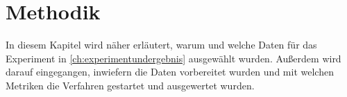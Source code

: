 \chapter{Methodik}
In diesem Kapitel wird näher erläutert, warum und welche Daten für das Experiment in \autoref{ch:experimentundergebnis} ausgewählt wurden. Außerdem wird darauf eingegangen, inwiefern die Daten vorbereitet wurden und mit welchen Metriken die Verfahren gestartet und ausgewertet wurden.


